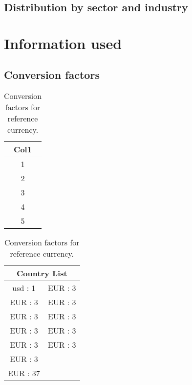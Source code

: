 \documentclass{article}
\begin{document}
\subsection*{Distribution by sector and industry}    

\section*{Information used}
\subsection*{Conversion factors}
\begin{table}[!h]
\begin{center}
\begin{tabular}{||c ||} 
 \hline
 Col1  \\ [0.5ex] 
 \hline\hline
 1  \\ 
 \hline
 2  \\
 \hline
 3  \\
 \hline
 4  \\
 \hline
 5  \\ 
 \hline
\end{tabular}
\caption{Conversion factors for reference currency.}
\end{center}
\end{table}

\begin{table}[!h]
\begin{center}
\begin{tabular}{ |c||c|  }
 \hline
 \multicolumn{2}{|c|}{Country List} \\
 \hline
 \hline
 usd : 1   & EUR : 3\\
 EUR : 3 &   EUR : 3\\
 EUR : 3 & EUR : 3 \\
 EUR : 3   & EUR : 3\\
 EUR : 3 &   EUR : 3 \\
 EUR : 3 & \\
 EUR : 37 &\\
 \hline
\end{tabular}
\caption{Conversion factors for reference currency.}
\end{center}
\end{table}
\end{document}
